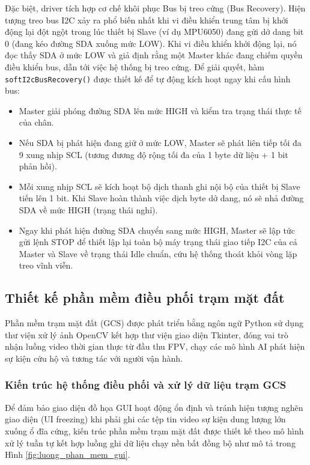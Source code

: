 Đặc biệt, driver tích hợp cơ chế khôi phục Bus bị treo cứng (Bus Recovery). Hiện tượng treo bus I2C xảy ra phổ biến nhất khi vi điều khiển trung tâm bị khởi động lại đột ngột trong lúc thiết bị Slave (ví dụ MPU6050) đang gửi dở dang bit 0 (đang kéo đường SDA xuống mức LOW). Khi vi điều khiển khởi động lại, nó đọc thấy SDA ở mức LOW và giả định rằng một Master khác đang chiếm quyền điều khiển bus, dẫn tới việc hệ thống bị treo cứng. Để giải quyết, hàm \texttt{softI2cBusRecovery()} được thiết kế để tự động kích hoạt ngay khi cấu hình bus:
\begin{itemize}
    \item Master giải phóng đường SDA lên mức HIGH và kiểm tra trạng thái thực tế của chân.
    \item Nếu SDA bị phát hiện đang giữ ở mức LOW, Master sẽ phát liên tiếp tối đa 9 xung nhịp SCL (tương đương độ rộng tối đa của 1 byte dữ liệu + 1 bit phản hồi).
    \item Mỗi xung nhịp SCL sẽ kích hoạt bộ dịch thanh ghi nội bộ của thiết bị Slave tiến lên 1 bit. Khi Slave hoàn thành việc dịch byte dở dang, nó sẽ nhả đường SDA về mức HIGH (trạng thái nghỉ).
    \item Ngay khi phát hiện đường SDA chuyển sang mức HIGH, Master sẽ lập tức gửi lệnh STOP để thiết lập lại toàn bộ máy trạng thái giao tiếp I2C của cả Master và Slave về trạng thái Idle chuẩn, cứu hệ thống thoát khỏi vòng lặp treo vĩnh viễn.
\end{itemize}

\subsection{Thiết kế phần mềm điều phối trạm mặt đất}

Phần mềm trạm mặt đất (GCS) được phát triển bằng ngôn ngữ Python sử dụng thư viện xử lý ảnh OpenCV kết hợp thư viện giao diện Tkinter, đóng vai trò nhận luồng video thời gian thực từ đầu thu FPV, chạy các mô hình AI phát hiện sự kiện cứu hộ và tương tác với người vận hành.

\subsubsection{Kiến trúc hệ thống điều phối và xử lý dữ liệu trạm GCS}

Để đảm bảo giao diện đồ họa GUI hoạt động ổn định và tránh hiện tượng nghẽn giao diện (UI freezing) khi phải ghi các tệp tin video sự kiện dung lượng lớn xuống ổ đĩa cứng, kiến trúc phần mềm trạm mặt đất được thiết kế theo mô hình xử lý tuần tự kết hợp luồng ghi dữ liệu chạy nền bất đồng bộ như mô tả trong Hình \ref{fig:luong_phan_mem_gui}.

